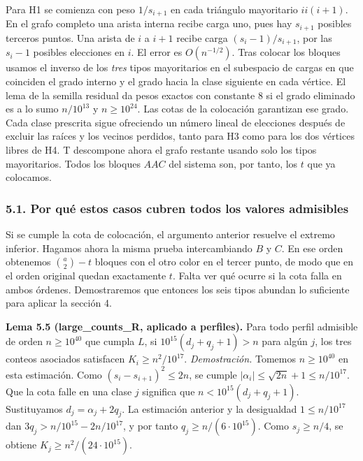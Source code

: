 \documentclass[spanish,11pt,a4paper]{article}
\begin{document}
Para H1 se comienza con peso \(1/s_{i+1}\) en cada triángulo mayoritario \(ii(i+1)\). En el grafo completo una arista interna recibe carga uno, pues hay \(s_{i+1}\) posibles terceros puntos. Una arista de \(i\) a \(i+1\) recibe carga \((s_i-1)/s_{i+1}\), por las \(s_i-1\) posibles elecciones en \(i\). El error es \(O(n^{-1/2})\). Tras colocar los bloques usamos el inverso de los \emph{tres} tipos mayoritarios en el subespacio de cargas en que coinciden el grado interno y el grado hacia la clase siguiente en cada vértice. El lema de la semilla residual da pesos exactos con constante 8 si el grado eliminado es a lo sumo \(n/10^{13}\) y \(n\ge10^{24}\). Las cotas de la colocación garantizan ese grado. Cada clase prescrita sigue ofreciendo un número lineal de elecciones después de excluir las raíces y los vecinos perdidos, tanto para H3 como para los dos vértices libres de H4. T descompone ahora el grafo restante usando solo los tipos mayoritarios. Todos los bloques \(AAC\) del sistema son, por tanto, los \(t\) que ya colocamos.

\subsubsection{5.1. Por qué estos casos cubren todos los valores admisibles}\label{por-quuxe9-estos-casos-cubren-todos-los-valores-admisibles}

Si se cumple la cota de colocación, el argumento anterior resuelve el extremo inferior. Hagamos ahora la misma prueba intercambiando \(B\) y \(C\). En ese orden obtenemos \(\binom a2-t\) bloques con el otro color en el tercer punto, de modo que en el orden original quedan exactamente \(t\). Falta ver qué ocurre si la cota falla en ambos órdenes. Demostraremos que entonces los seis tipos abundan lo suficiente para aplicar la sección 4.

\textbf{Lema 5.5 (large\_counts\_R, aplicado a perfiles).} Para todo perfil admisible de orden \(n\ge10^{40}\) que cumpla \(L\), si \(10^{15}(d_j+q_j+1)>n\) para algún \(j\), los tres conteos asociados satisfacen \(K_i\ge n^2/10^{17}\). \emph{Demostración.} Tomemos \(n\ge10^{40}\) en esta estimación. Como \((s_i-s_{i+1})^2\le2n\), se cumple \(|\alpha_i|\le\sqrt{2n}+1\le n/10^{17}\). Que la cota falle en una clase \(j\) significa que \(n<10^{15}(d_j+q_j+1)\). Sustituyamos \(d_j=\alpha_j+2q_j\). La estimación anterior y la desigualdad \(1\le n/10^{17}\) dan \(3q_j>n/10^{15}-2n/10^{17}\), y por tanto \(q_j\ge n/(6\cdot10^{15})\). Como \(s_j\ge n/4\), se obtiene \(K_j\ge n^2/(24\cdot10^{15})\).
\end{document}
